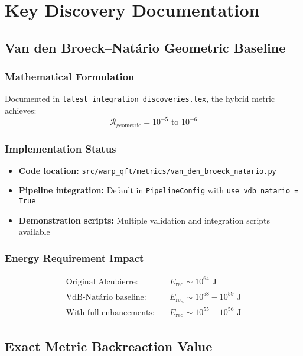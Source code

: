\documentclass[11pt]{article}
\begin{document}
\section{Key Discovery Documentation}

\subsection{Van den Broeck–Natário Geometric Baseline}

\subsubsection{Mathematical Formulation}
Documented in \texttt{latest\_integration\_discoveries.tex}, the hybrid metric achieves:
\begin{equation}
\mathcal{R}_{\text{geometric}} = 10^{-5} \text{ to } 10^{-6}
\end{equation}

\subsubsection{Implementation Status}
\begin{itemize}
\item \textbf{Code location:} \texttt{src/warp\_qft/metrics/van\_den\_broeck\_natario.py}
\item \textbf{Pipeline integration:} Default in \texttt{PipelineConfig} with \texttt{use\_vdb\_natario = True}
\item \textbf{Demonstration scripts:} Multiple validation and integration scripts available
\end{itemize}

\subsubsection{Energy Requirement Impact}
\begin{align}
\text{Original Alcubierre:} \quad &E_{\text{req}} \sim 10^{64} \text{ J} \\
\text{VdB-Natário baseline:} \quad &E_{\text{req}} \sim 10^{58}-10^{59} \text{ J} \\
\text{With full enhancements:} \quad &E_{\text{req}} \sim 10^{55}-10^{56} \text{ J}
\end{align}

\subsection{Exact Metric Backreaction Value}
\end{document}
